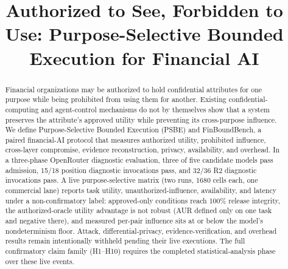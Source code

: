 \documentclass[sigconf,anonymous,review]{acmart}
\title{Authorized to See, Forbidden to Use: Purpose-Selective Bounded
Execution for Financial AI}
\begin{document}
\begin{abstract}
Financial organizations may be authorized to hold confidential attributes for
one purpose while being prohibited from using them for another. Existing
confidential-computing and agent-control mechanisms do not by themselves show
that a system preserves the attribute's approved utility while preventing its
cross-purpose influence. We define Purpose-Selective Bounded Execution (PSBE)
and FinBoundBench, a paired financial-AI protocol that measures authorized
utility, prohibited influence, cross-layer compromise, evidence reconstruction,
privacy, availability, and overhead. In a three-phase OpenRouter diagnostic
evaluation, three of five candidate models pass admission, 15/18 position
diagnostic invocations pass, and 32/36 R2 diagnostic invocations pass. A live
purpose-selective matrix (two runs, 1680 cells each, one commercial lane)
reports task utility, unauthorized-influence, availability, and latency under a
non-confirmatory label: approved-only conditions reach 100\% release integrity,
the authorized-oracle utility advantage is not robust (AUR defined only on one
task and negative there), and measured per-pair influence sits at or below the
model's nondeterminism floor. Attack, differential-privacy,
evidence-verification, and overhead results remain intentionally withheld
pending their live executions. The full confirmatory claim family (H1--H10)
requires the completed statistical-analysis phase over these live events.
\end{abstract}


\maketitle













\end{document}
